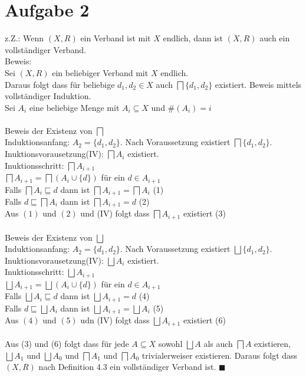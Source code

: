 \section*{Aufgabe 2}

z.Z.: Wenn $(X,R)$ ein Verband ist mit $X$ endlich, dann ist $(X,R)$ auch ein vollständiger Verband.\\

Beweis:\\
Sei $(X,R)$ ein beliebiger Verband mit $X$ endlich.\\
Daraus folgt dass für beliebige $d_1, d_2 \in X$ auch $\bigsqcap \{d_1,d_2\}$ existiert.
Beweis mittels vollständiger Induktion.\\
Sei $A_i$ eine beliebige Menge mit $A_i \subseteq X$ und $\#(A_i) = i$\\\\
Beweis der Existenz von $\bigsqcap$\\
Induktionsanfang: $A_2 = \{d_1,d_2\}$. Nach Voraussetzung existiert $\bigsqcap \{d_1,d_2\}$.\\
Inuktionsvorausetzung(IV): $\bigsqcap A_i$ existiert.\\
Inuktionsschritt: $\bigsqcap A_{i+1}$ \\
$\bigsqcap A_{i+1} = \bigsqcap(A_{i} \cup \{d\})$ für ein $d \in A_{i+1}$\\
Falls $\bigsqcap A_{i} \sqsubseteq d$ dann ist $\bigsqcap A_{i+1} = \bigsqcap A_{i}$ (1)\\
Falls $d \sqsubseteq \bigsqcap A_{i}$ dann ist $\bigsqcap A_{i+1} = d$ (2)\\
Aus $(1)$ und $(2)$ und (IV) folgt dass $\bigsqcap A_{i+1}$ existiert (3)\\\\
Beweis der Existenz von $\bigsqcup$\\
Induktionsanfang: $A_2 = \{d_1,d_2\}$. Nach Voraussetzung existiert $\bigsqcup \{d_1,d_2\}$.\\
Inuktionsvorausetzung(IV): $\bigsqcup A_i$ existiert.\\
Inuktionsschritt: $\bigsqcup A_{i+1}$ \\
$\bigsqcup A_{i+1} = \bigsqcup(A_{i} \cup \{d\})$ für ein $d \in A_{i+1}$\\
Falls $\bigsqcup A_{i} \sqsubseteq d$ dann ist $\bigsqcup A_{i+1} = d$ (4)\\
Falls $d \sqsubseteq \bigsqcup A_{i}$ dann ist $\bigsqcup A_{i+1} = \bigsqcup A_{i}$ (5)\\
Aus $(4)$ und $(5)$ udn (IV) folgt dass $\bigsqcup A_{i+1}$ existiert (6)\\\\
Aus (3) und (6) folgt dass für jede $A \subseteq X$ sowohl  $\bigsqcup A$ als auch $\bigsqcap A$ existieren, $\bigsqcup A_1$ und $\bigsqcup A_0$ und  $\bigsqcap A_1$ und $\bigsqcap A_0$ trivialerweiser existieren. Daraus folgt dass $(X,R)$ nach Definition 4.3 ein vollständiger Verband ist. $\blacksquare$
